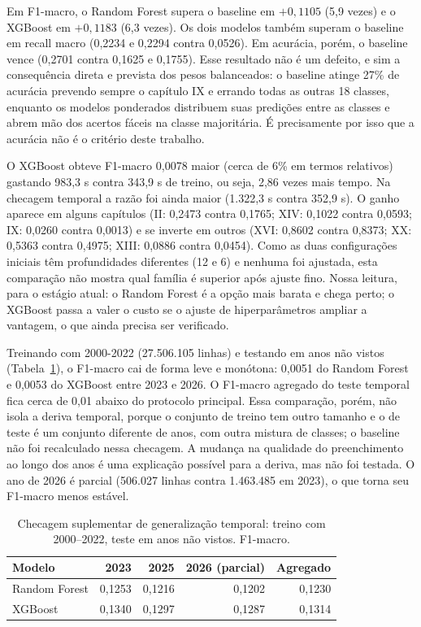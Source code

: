 \documentclass[12pt]{article}
\begin{document}
Em F1-macro, o Random Forest supera o baseline em $+0{,}1105$ (5,9 vezes) e o XGBoost em $+0{,}1183$ (6,3 vezes). Os dois modelos também superam o baseline em recall macro (0,2234 e 0,2294 contra 0,0526). Em acurácia, porém, o baseline vence (0,2701 contra 0,1625 e 0,1755). Esse resultado não é um defeito, e sim a consequência direta e prevista dos pesos balanceados: o baseline atinge 27\% de acurácia prevendo sempre o capítulo IX e errando todas as outras 18 classes, enquanto os modelos
ponderados distribuem suas predições entre as classes e abrem mão dos acertos fáceis na classe majoritária. É precisamente por isso que a acurácia não é o critério deste trabalho.

O XGBoost obteve F1-macro 0,0078 maior (cerca de 6\% em termos relativos) gastando 983,3 s contra 343,9 s de treino, ou seja, 2,86 vezes mais tempo. Na checagem temporal a razão foi ainda maior (1.322,3 s contra 352,9 s). O ganho aparece em alguns capítulos (II: 0,2473 contra 0,1765; XIV: 0,1022 contra 0,0593; IX: 0,0260 contra 0,0013) e se inverte em outros (XVI: 0,8602 contra 0,8373; XX: 0,5363 contra 0,4975; XIII: 0,0886 contra 0,0454). Como as duas configurações iniciais têm profundidades diferentes (12 e 6) e nenhuma foi ajustada, esta comparação não mostra qual família é superior após ajuste fino. Nossa leitura, para o estágio atual: o Random Forest é a opção mais barata e chega perto; o XGBoost passa a valer o custo se o ajuste de hiperparâmetros ampliar a vantagem, o que ainda precisa ser verificado.

Treinando com 2000-2022 (27.506.105 linhas) e testando em anos não vistos
(Tabela~\ref{tab:temporal}), o F1-macro cai de forma leve e monótona: 0,0051 do Random Forest e 0,0053 do XGBoost entre 2023 e 2026. O F1-macro agregado do teste temporal fica cerca de 0,01 abaixo do protocolo principal. Essa comparação, porém, não isola a deriva temporal, porque o conjunto de treino tem outro tamanho e o de teste é um conjunto diferente de anos, com outra mistura de classes; o baseline não foi recalculado nessa checagem. A mudança na qualidade do preenchimento ao longo dos anos é uma explicação possível para a deriva, mas não foi testada. O ano de 2026 é parcial (506.027 linhas contra 1.463.485 em 2023), o que torna seu F1-macro menos estável.

\begin{table}[ht]
\centering
\caption{Checagem suplementar de generalização temporal: treino com 2000--2022,
  teste em anos não vistos. F1-macro.}
\label{tab:temporal}
\begin{tabular}{|l|r|r|r|r|}
\hline
\textbf{Modelo} & \textbf{2023} & \textbf{2025} & \textbf{2026 (parcial)}
  & \textbf{Agregado} \\
\hline
Random Forest & 0,1253 & 0,1216 & 0,1202 & 0,1230 \\
XGBoost       & 0,1340 & 0,1297 & 0,1287 & 0,1314 \\
\hline
\end{tabular}
\end{table}
\end{document}
